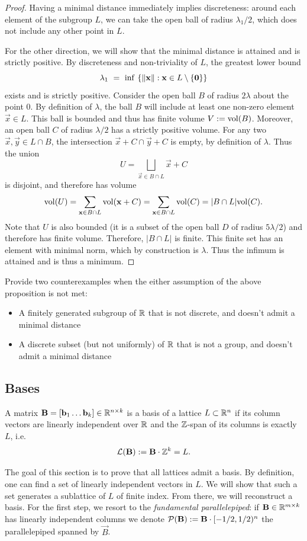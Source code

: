 \begin{proof}
Having a minimal distance immediately implies discreteness: around each element of the subgroup $L$, we can take the open ball of radius $\lambda_1/2$, which does not include any other point in $L$.

For the other direction, we will show that the minimal distance is attained and is strictly positive.
By discreteness and non-triviality of $L$, the greatest lower bound \[\lambda_1~=~\inf~\{ \|\mathbf{x}\| : \mathbf{x} \in L \setminus\{\mathbf{0}\} \}\] exists and is strictly positive.
Consider the open ball $B$ of radius $2\lambda$ about the point $0$.
By definition of $\lambda$, the ball $B$ will include at least one non-zero element $\vec x \in L$.
This ball is bounded and thus has finite volume $V := \mathrm{vol}(B)$.
Moreover, an open ball $C$ of radius $\lambda/2$ has a strictly positive volume.
For any two $\vec x , \vec y \in L \cap B$, the intersection $\vec x + C \cap \vec y + C$ is empty, by definition of $\lambda$.
Thus the union
\[
U = \bigsqcup_{\vec x \in B \cap L}  \vec x + C
\]
is disjoint, and therefore has volume
\[
\mathrm{vol}(U) = \sum_{\mathbf{x} \in B \cap L} \mathrm{vol} (\mathbf{x} + C) = \sum_{\mathbf{x} \in B \cap L} \mathrm{vol} (C) = |B\cap L| \mathrm{vol}(C).
\]
Note that $U$ is also bounded (it is a subset of the open ball $D$ of radius $5\lambda / 2$) and therefore has finite volume. Therefore, $|B \cap L|$ is finite. This finite set has an element with minimal norm, which by construction is $\lambda$. Thus the infimum is attained and is thus a minimum.
\end{proof}
\begin{exercise}Provide two counterexamples when the either assumption of the above proposition is not met:
\begin{itemize}
	\item A finitely generated subgroup of $\mathbb{R}$ that is not discrete, and doesn't admit a minimal distance
	\item A discrete subset (but not uniformly) of $\mathbb{R}$ that is not a group, and doesn't admit a minimal distance
\end{itemize}
\end{exercise}

\subsection{Bases}

\begin{definition} A matrix $\mathbf{B} = [\mathbf{b}_1 \dots \mathbf{b}_k] \in \mathbb{R}^{n \times k}$ is a basis of a lattice $L \subset \mathbb{R}^n$ if its column vectors are linearly independent over $\mathbb{R}$ and the $\mathbb{Z}$-span of its columns is exactly $L$, i.e.
\[\mathcal{L}(\mathbf{B}) := \mathbf{B} \cdot \mathbb{Z}^k = L.\]
\end{definition}
The goal of this section is to prove that all lattices admit a basis. By definition, one can find a set of linearly independent vectors in $L$. We will show that such a set generates a sublattice of $L$ of finite index. From there, we will reconstruct a basis. For the first step, we resort to the \emph{fundamental parallelepiped}: if $\mathbf{B} \in \mathbb{R}^{m \times k}$ has linearly independent columns we denote $\mathcal P(\mathbf{B}):= \mathbf{B} \cdot [-1/2, 1/2)^n$ the parallelepiped spanned by $\vec B$.

